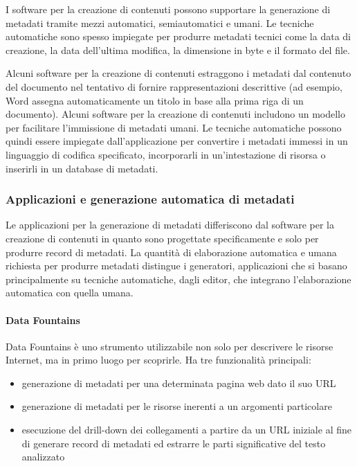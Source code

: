 I software per la creazione di contenuti possono supportare la generazione di metadati tramite mezzi automatici, semiautomatici e umani. Le tecniche automatiche sono spesso impiegate per produrre metadati tecnici come la data di creazione, la data dell'ultima modifica, la dimensione in byte e il formato del file.

Alcuni software per la creazione di contenuti estraggono i metadati dal contenuto del documento nel tentativo di fornire rappresentazioni descrittive (ad esempio, Word assegna automaticamente un titolo in base alla prima riga di un documento). Alcuni software per la creazione di contenuti includono un modello per facilitare l'immissione di metadati umani. Le tecniche automatiche possono quindi essere impiegate dall'applicazione per convertire i metadati immessi in un linguaggio di codifica specificato, incorporarli in un'intestazione di risorsa o inserirli in un database di metadati.

\subsubsection{Applicazioni e generazione automatica di metadati}
Le applicazioni per la generazione di metadati differiscono dal software per la creazione di contenuti in quanto sono progettate specificamente e solo per produrre record di metadati. 
La quantità di elaborazione automatica e umana richiesta per produrre metadati distingue i generatori, applicazioni che si basano principalmente su tecniche automatiche, dagli editor, che integrano l'elaborazione automatica con quella umana.

\paragraph{Data Fountains}
Data Fountains è uno strumento utilizzabile non solo per descrivere le risorse Internet, ma in primo luogo per scoprirle. Ha tre funzionalità principali:

\begin{itemize}
\item generazione di metadati per una determinata pagina web dato il suo URL
\item generazione di metadati per le risorse inerenti a un argomenti particolare
\item esecuzione del drill-down dei collegamenti a partire da un URL iniziale al fine di generare record di metadati ed estrarre le parti significative del testo analizzato
\end{itemize}

